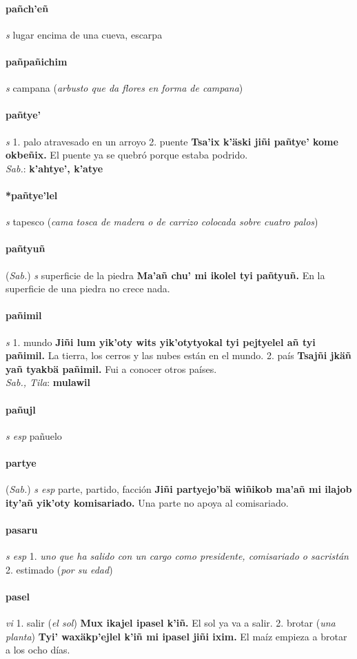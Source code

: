 \documentclass{scrbook}
\newcommand{\entry}[1]{\paragraph{#1}}
\newcommand{\onedefinition}[1]{#1.}
\newcommand{\nontranslationdef}[1]{\textit{#1}}
\newcommand{\partofspeech}[1]{\textit{#1}}
\newcommand{\spanishtranslation}[1]{#1}
\newcommand{\clarification}[1]{(\textit{#1})}
\newcommand{\cholexample}[1]{\textbf{#1}}
\newcommand{\exampletranslation}[1]{#1}
\newcommand{\dialectvariant}[1]{\\\textit{#1}:}
\newcommand{\dialectword}[1]{\textbf{#1}}
\newcommand{\relevantdialect}[1]{(\textit{#1})}
\begin{document}
\begin{multicols}{2}
\entry{pañch'eñ}
\partofspeech{s}
\spanishtranslation{lugar encima de una cueva, escarpa}

\entry{pañpañichim}
\partofspeech{s}
\spanishtranslation{campana}
\clarification{arbusto que da flores en forma de campana}

\entry{pañtye'}
\partofspeech{s}
\onedefinition{1}
\spanishtranslation{palo atravesado en un arroyo}
\onedefinition{2}
\spanishtranslation{puente}
\cholexample{Tsa'ix k'äski jiñi pañtye' kome okbeñix.}
\exampletranslation{El puente ya se quebró porque estaba podrido.}
\dialectvariant{Sab.}
\dialectword{k'ahtye', k'atye}

\entry{*pañtye'lel}
\partofspeech{s}
\spanishtranslation{tapesco}
\clarification{cama tosca de madera o de carrizo colocada sobre cuatro palos}

\entry{pañtyuñ}
\relevantdialect{Sab.}
\partofspeech{s}
\spanishtranslation{superficie de la piedra}
\cholexample{Ma'añ chu' mi ikolel tyi pañtyuñ.}
\exampletranslation{En la superficie de una piedra no crece nada.}

\entry{pañimil}
\partofspeech{s}
\onedefinition{1}
\spanishtranslation{mundo}
\cholexample{Jiñi lum yik'oty wits yik'otytyokal tyi pejtyelel añ tyi pañimil.}
\exampletranslation{La tierra, los cerros y las nubes están en el mundo.}
\onedefinition{2}
\spanishtranslation{país}
\cholexample{Tsajñi jkäñ yañ tyakbä pañimil.}
\exampletranslation{Fui a conocer otros países.}
\dialectvariant{Sab., Tila}
\dialectword{mulawil}

\entry{pañujl}
\partofspeech{s esp}
\spanishtranslation{pañuelo}

\entry{partye}
\relevantdialect{Sab.}
\partofspeech{s esp}
\spanishtranslation{parte, partido, facción}
\cholexample{Jiñi partyejo'bä wiñikob ma'añ mi ilajob ity'añ yik'oty komisariado.}
\exampletranslation{Una parte no apoya al comisariado.}

\entry{pasaru}
\partofspeech{s esp}
\onedefinition{1}
\nontranslationdef{uno que ha salido con un cargo como presidente, comisariado o sacristán}
\onedefinition{2}
\spanishtranslation{estimado}
\clarification{por su edad}

\entry{pasel}
\partofspeech{vi}
\onedefinition{1}
\spanishtranslation{salir}
\clarification{el sol}
\cholexample{Mux ikajel ipasel k'iñ.}
\exampletranslation{El sol ya va a salir.}
\onedefinition{2}
\spanishtranslation{brotar}
\clarification{una planta}
\cholexample{Tyi' waxäkp'ejlel k'iñ mi ipasel jiñi ixim.}
\exampletranslation{El maíz empieza a brotar a los ocho días.}


\end{multicols}
\end{document}
